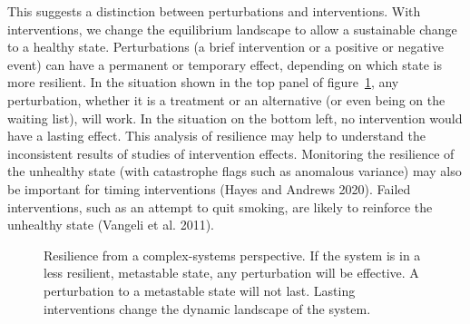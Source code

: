 \documentclass[
  a4paper,
  DIV=11,
  numbers=noendperiod,
  oneside]{scrreprt}
\begin{document}
This suggests a distinction between perturbations and interventions.
With interventions, we change the equilibrium landscape to allow a
sustainable change to a healthy state. Perturbations (a brief
intervention or a positive or negative event) can have a permanent or
temporary effect, depending on which state is more resilient. In the
situation shown in the top panel of figure~\ref{fig-ch6-img10-old-79},
any perturbation, whether it is a treatment or an alternative (or even
being on the waiting list), will work. In the situation on the bottom
left, no intervention would have a lasting effect. This analysis of
resilience may help to understand the inconsistent results of studies of
intervention effects. Monitoring the resilience of the unhealthy state
(with catastrophe flags such as anomalous variance) may also be
important for timing interventions (Hayes and Andrews 2020). Failed
interventions, such as an attempt to quit smoking, are likely to
reinforce the unhealthy state (Vangeli et al. 2011).

\begin{figure}


\caption{\label{fig-ch6-img10-old-79}Resilience from a complex-systems
perspective. If the system is in a less resilient, metastable state, any
perturbation will be effective. A perturbation to a metastable state
will not last. Lasting interventions change the dynamic landscape of the
system.}

\end{figure}%
\end{document}
